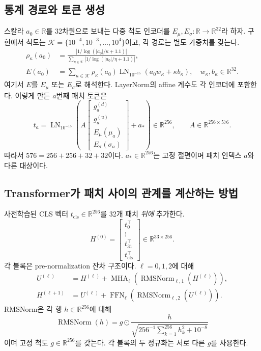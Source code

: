 \documentclass[11pt,a4paper]{article}
\newcommand{\R}{\mathbb R}
\DeclareMathOperator{\LN}{LN}
\DeclareMathOperator{\RMS}{RMSNorm}
\numberwithin{equation}{section}
\begin{document}
\subsection{통계 경로와 토큰 생성}
스칼라 $a_0\in\R$를 32차원으로 보내는 다중 척도 인코더를
$E_\mu,E_\sigma:\R\to\R^{32}$라 하자.
구현에서 척도는 $\mathcal K=\{10^{-4},10^{-3},\ldots,10^4\}$이고,
각 경로는 별도 가중치를 갖는다.
\begin{align}
 \rho_\kappa(a_0)&=
 \frac{\left|1/\log(|a_0|/\kappa+1.1)\right|}
 {\sum_{\eta\in\mathcal K}\left|1/\log(|a_0|/\eta+1.1)\right|},\\
 E(a_0)&=\sum_{\kappa\in\mathcal K}\rho_\kappa(a_0)
 \LN_{10^{-15}}(a_0w_\kappa+\kappa b_\kappa),\quad
 w_\kappa,b_\kappa\in\R^{32}.
\end{align}
여기서 $E$를 $E_\mu$ 또는 $E_\sigma$로 해석한다.
LayerNorm의 affine 계수도 각 인코더에 포함한다.
이렇게 만든 $a$번째 패치 토큰은
\begin{equation}
 t_a=\LN_{10^{-15}}\!\left(
 A\begin{bmatrix}g^{(d)}_a\\g^{(u)}_a\\E_\mu(\mu_a)\\E_\sigma(\sigma_a)\end{bmatrix}
 +a_*\right)\in\R^{256},\qquad A\in\R^{256\times576}.
 \label{eq:token}
\end{equation}
따라서 $576=256+256+32+32$이다.
$a_*\in\R^{256}$는 고정 절편이며 패치 인덱스 $a$와 다른 대상이다.

\subsection{Transformer가 패치 사이의 관계를 계산하는 방법}
사전학습된 CLS 벡터 $t_{\mathrm{cls}}\in\R^{256}$를
32개 패치 \emph{뒤에} 추가한다.
\begin{equation}
 H^{(0)}=\begin{bmatrix}t_0^\top\\\vdots\\t_{31}^\top\\t_{\mathrm{cls}}^\top\end{bmatrix}
 \in\R^{33\times256}.
\end{equation}
각 블록은 pre-normalization 잔차 구조이다.
$\ell=0,1,2$에 대해
\begin{align}
 U^{(\ell)}&=H^{(\ell)}+
       \operatorname{MHA}_{\ell}(\RMS_{\ell,1}(H^{(\ell)})),\\
 H^{(\ell+1)}&=U^{(\ell)}+
       \operatorname{FFN}_{\ell}(\RMS_{\ell,2}(U^{(\ell)})).
 \label{eq:block}
\end{align}
RMSNorm은 각 행 $h\in\R^{256}$에 대해
\begin{equation}
 \RMS(h)=g\odot\frac{h}{\sqrt{256^{-1}\sum_{k=1}^{256}h_k^2+10^{-8}}}
\end{equation}
이며 고정 척도 $g\in\R^{256}$를 갖는다.
각 블록의 두 정규화는 서로 다른 $g$를 사용한다.
\end{document}
